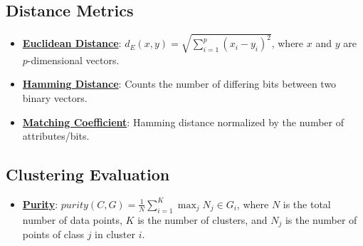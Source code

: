 \documentclass{article}%
\begin{document}
%
\subsection{Distance Metrics}%
\label{subsec:DistanceMetrics}%
\begin{itemize}[leftmargin=*]%
\item \href{https://purdue.brightspace.com/d2l/common/assets/pdfjs-d2l-dist/1.0.14-legacy/web/viewer.html?file=%2Fcontent%2Fenforced%2F1095467-wl.202510.CS.24300.001%2F12L2-distance-clusters.pdf%3Fou%3D1095467&lang=en-us&container=d2l-fileviewer-rendered-pdf&fullscreen=d2l-fileviewer-rendered-pdf-dialog&height=667#page=17}{\textbf{Euclidean Distance}}: $d_E(x, y) = \sqrt{\sum_{i=1}^{p} (x_i - y_i)^2}$, where $x$ and $y$ are $p$-dimensional vectors.%
\item \href{https://purdue.brightspace.com/d2l/common/assets/pdfjs-d2l-dist/1.0.14-legacy/web/viewer.html?file=%2Fcontent%2Fenforced%2F1095467-wl.202510.CS.24300.001%2F12L2-distance-clusters.pdf%3Fou%3D1095467&lang=en-us&container=d2l-fileviewer-rendered-pdf&fullscreen=d2l-fileviewer-rendered-pdf-dialog&height=667#page=19}{\textbf{Hamming Distance}}: Counts the number of differing bits between two binary vectors.%
\item \href{https://purdue.brightspace.com/d2l/common/assets/pdfjs-d2l-dist/1.0.14-legacy/web/viewer.html?file=%2Fcontent%2Fenforced%2F1095467-wl.202510.CS.24300.001%2F12L2-distance-clusters.pdf%3Fou%3D1095467&lang=en-us&container=d2l-fileviewer-rendered-pdf&fullscreen=d2l-fileviewer-rendered-pdf-dialog&height=667#page=19}{\textbf{Matching Coefficient}}: Hamming distance normalized by the number of attributes/bits.%
\end{itemize}

%
\subsection{Clustering Evaluation}%
\label{subsec:ClusteringEvaluation}%
\begin{itemize}[leftmargin=*]%
\item \href{https://purdue.brightspace.com/d2l/common/assets/pdfjs-d2l-dist/1.0.14-legacy/web/viewer.html?file=%2Fcontent%2Fenforced%2F1095467-wl.202510.CS.24300.001%2F12L2-distance-clusters.pdf%3Fou%3D1095467&lang=en-us&container=d2l-fileviewer-rendered-pdf&fullscreen=d2l-fileviewer-rendered-pdf-dialog&height=667#page=44}{\textbf{Purity}}: $purity(C, G) = \frac{1}{N} \sum_{i=1}^{K} \max_{j} N_j \in G_i$, where $N$ is the total number of data points, $K$ is the number of clusters, and $N_j$ is the number of points of class $j$ in cluster $i$.%
\end{itemize}

%
\end{document}
